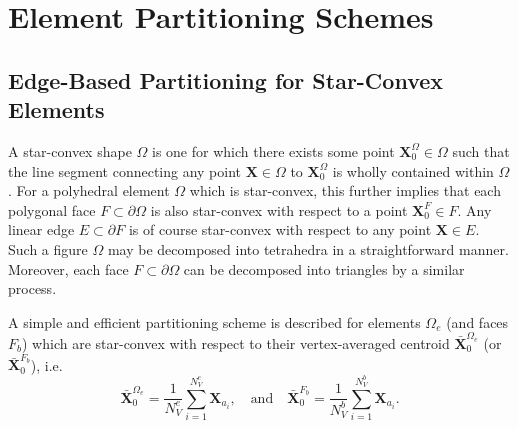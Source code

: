 \section{Element Partitioning Schemes}

\subsection{Edge-Based Partitioning for Star-Convex Elements}

	A star-convex shape $\Omega$ is one for which there exists some point $\mathbf{X}^{\Omega}_0 \in \Omega$ such that the line segment connecting any point $\mathbf{X} \in \Omega$ to $\mathbf{X}^{\Omega}_0$ is wholly contained within $\Omega$. For a polyhedral element $\Omega$ which is star-convex, this further implies that each polygonal face $F \subset \partial \Omega$ is also star-convex with respect to a point $\mathbf{X}^{F}_0 \in F$. Any linear edge $E \subset \partial F$ is of course star-convex with respect to any point $\mathbf{X} \in E$. Such a figure $\Omega$ may be decomposed into tetrahedra in a straightforward manner. Moreover, each face $F \subset \partial \Omega$ can be decomposed into triangles by a similar process.
	
	A simple and efficient partitioning scheme is described for elements $\Omega_e$ (and faces $F_b$) which are star-convex with respect to their vertex-averaged centroid $\bar{\mathbf{X}}^{\Omega_e}_0$ (or $\bar{\mathbf{X}}^{F_b}_0$), i.e.
	\begin{equation}
		\bar{\mathbf{X}}^{\Omega_e}_0 = \frac{1}{N^e_V} \sum_{i = 1}^{N^e_V} \mathbf{X}_{a_i}, \quad \text{and} \quad \bar{\mathbf{X}}^{F_b}_0 = \frac{1}{N^b_V} \sum_{i = 1}^{N^b_V} \mathbf{X}_{a_i}.
	\end{equation}
	
